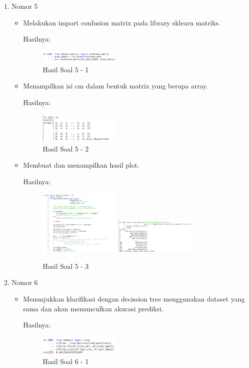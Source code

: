 \begin{enumerate}
\item Nomor 5
\hfill\break
\begin{itemize}
\item Melakukan import confusion matrix pada library sklearn matriks.

Hasilnya:
\begin{figure}[H]
	\centering
		\includegraphics[width=4cm]{figures/1174054/3/25.png}
		\caption{Hasil Soal 5 - 1}
\end{figure}
		
\item Menampilkan isi cm dalam bentuk matrix yang berupa array.

Hasilnya:
\begin{figure}[H]
	\centering
		\includegraphics[width=4cm]{figures/1174054/3/26.png}
		\caption{Hasil Soal 5 - 2}
\end{figure}
		
\item Membuat dan menampilkan hasil plot.

Hasilnya:
\begin{figure}[H]
	\centering
		\includegraphics[width=4cm]{figures/1174054/3/27.png}
		\includegraphics[width=4cm]{figures/1174054/3/28.png}
		\caption{Hasil Soal 5 - 3}
\end{figure}
\end{itemize}

\item Nomor 6
\hfill\break
\begin{itemize}
\item Menunjukkan klarifikasi dengan decission tree menggunakan dataset yang sama dan akan memunculkan akurasi prediksi.

Hasilnya:
\begin{figure}[H]
	\centering
		\includegraphics[width=4cm]{figures/1174054/3/29.png}
		\caption{Hasil Soal 6 - 1}
\end{figure}
		

\end{itemize}
\end{enumerate}
